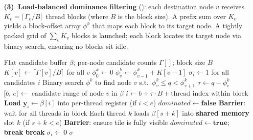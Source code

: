\documentclass[letterpaper]{article}
\begin{document}
\textbf{(3)~Load-balanced dominance filtering} (): each destination node $v$ receives $K_v = \lceil \Gamma_v / B \rceil$ thread blocks (where $B$ is the block size). A prefix sum over $K_v$ yields a block-offset array $\phi^k$ that maps each block to its target node. A tightly packed grid of $\sum_v K_v$ blocks is launched; each block locates its target node via binary search, ensuring no blocks sit idle.

\begin{algorithm}[tbp]
\caption{GPU Dominance Filtering: Dynamic 1D Load-Balanced Scheduling}
\label{alg:dynamic_1D_kernel}
\begin{algorithmic}[1]
\Require Flat candidate buffer $\beta$; per-node candidate counts $\Gamma[]$; block size $B$
\State $K[v] \gets \lceil \Gamma[v] / B \rceil$ for all $v$ 
\State $\phi^k_0 \gets 0$
    \State $\phi^k_v \gets \phi^k_{v-1} + K[v-1]$
\EndFor
\State $\sigma_i \gets 1$ for all candidates $i$
    \State Binary search $\phi^k$ to find node $v$ s.t.\ $\phi^k_v \le q < \phi^k_{v{+}1}$
    \State $\tau \gets q - \phi^k_v$ 
    \State $[b,\, e) \gets$ candidate range of node $v$ in $\beta$
    \State $i \gets b + \tau \cdot B + \text{thread index within block}$
    \State \textbf{Load} $\mathbf{y}_i \gets \beta[i]$ into per-thread register (if $i < e$) 
    \State $\mathit{dominated} \gets \mathbf{false}$
        \State \textbf{Barrier}: wait for all threads in block
        \State Each thread $k$ loads $\beta[s{+}k]$ into \textbf{shared memory} slot $k$ \;(if $s{+}k < e$)
        \State \textbf{Barrier}: ensure tile is fully visible
                \; $\mathit{dominated} \gets \mathbf{true}$; \textbf{break} \EndIf
            \EndFor {}
        \EndIf
         \textbf{break} \EndIf {}
    \EndFor
    \; $\sigma_i \gets 0$ \EndIf
\EndFor
\State \Return $\sigma$
\EndProcedure
\end{algorithmic}
\end{algorithm}
\end{document}
